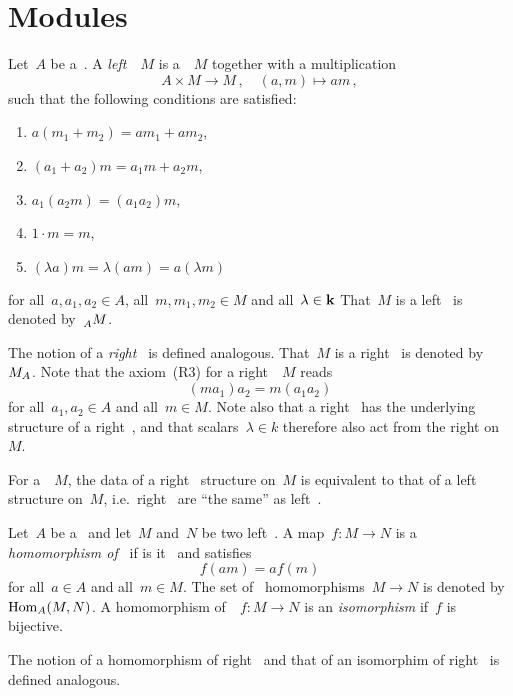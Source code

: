 \section{Modules}


\begin{definition}
  Let~$A$ be a~{\kalg}.
  A \emph{left~{\Amod}}~$M$ is a~{\kmod}~$M$ together with a multiplication
  \[
            A \times M
    \to     M \,,
    \quad   (a,m)
    \mapsto am \,,
  \]
  such that the following conditions are satisfied:
  \begin{enumerate}[label={(L\arabic*})]
    \item
      $a(m_1 + m_2) = am_1 + am_2$,
    \item
      $(a_1 + a_2) m = a_1 m + a_2 m$,
    \item
      $a_1 (a_2 m) = (a_1 a_2) m$,
    \item
      $1 \cdot m = m$,
    \item
      $(\lambda a)m = \lambda (am) = a (\lambda m)$
  \end{enumerate}
  for all~$a, a_1, a_2 \in A$, all~$m, m_1, m_2 \in M$ and all~$\lambda \in \mathbf{k}$
  That~$M$ is a left~{\Amod} is denoted by~$\prescript{}{A}{M}$.
  
  The notion of a \emph{right~{\Amod}} is defined analogous.
  That~$M$ is a right~{\Amod} is denoted by~$M_{A}$.
  Note that the axiom~(R3) for a right~{\Amod}~$M$ reads
  \[
      (m a_1) a_2
    = m (a_1 a_2)
  \]
  for all~$a_1, a_2 \in A$ and all~$m \in M$.
  Note also that a right~{\Amod} has the underlying structure of a right~{\kmod}, and that scalars~$\lambda \in k$ therefore also act from the right on~$M$.
\end{definition}


\begin{remark}
  For a~{\kmod}~$M$, the data of a right~{\Amod} structure on~$M$ is equivalent to that of a left~{\Aopmod} structure on~$M$, i.e.\ right~{\Amods} are \enquote{the same} as left~{\Aopmods}.
\end{remark}


\begin{definition}
  Let~$A$ be a~{\kalg} and let~$M$ and~$N$ be two left~{\Amods}.
  A map~$f \colon M \to N$ is a \emph{homomorphism of~{\Amods}} if is it~{\klin} and satisfies
  \[
      f(am)
    = a f(m)
  \]
  for all~$a \in A$ and all~$m \in M$.
  The set of~{\Amod} homomorphisms~$M \to N$ is denoted by~$\operatorname{Hom}_A(M,N)$.
  A homomorphism of~{\Amods}~$f \colon M \to N$ is an \emph{isomorphism} if~$f$ is bijective.
  
  The notion of a homomorphism of right~{\Amods} and that of an isomorphim of right~{\Amods} is defined analogous.
\end{definition}


